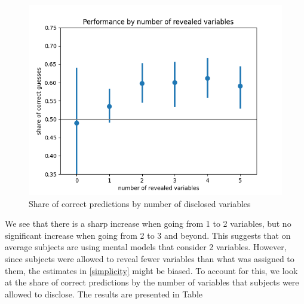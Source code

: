 \documentclass[
  12pt,
]{article}
\begin{document}
\begin{figure}

{\centering \includegraphics[width=0.5\linewidth]{../computed_objects/figures/revealed_variables_pooled} 

}

\caption{\label{simplicity} Share of correct predictions by number of disclosed variables}\label{fig:simplicity}
\end{figure}

We see that there is a sharp increase when going from 1 to 2 variables,
but no significant increase when going from 2 to 3 and beyond. This
suggests that on average subjects are using mental models that consider
2 variables. However, since subjects were allowed to reveal fewer
variables than what was assigned to them, the estimates in
\ref{simplicity} might be biased. To account for this, we look at the
share of correct predictions by the number of variables that subjects
were allowed to disclose. The results are presented in Table

 
  \providecommand{\huxb}[2]{\arrayrulecolor[RGB]{#1}\global\arrayrulewidth=#2pt}
  \providecommand{\huxvb}[2]{\color[RGB]{#1}\vrule width #2pt}
  \providecommand{\huxtpad}[1]{\rule{0pt}{#1}}
  \providecommand{\huxbpad}[1]{\rule[-#1]{0pt}{#1}}
\end{document}
